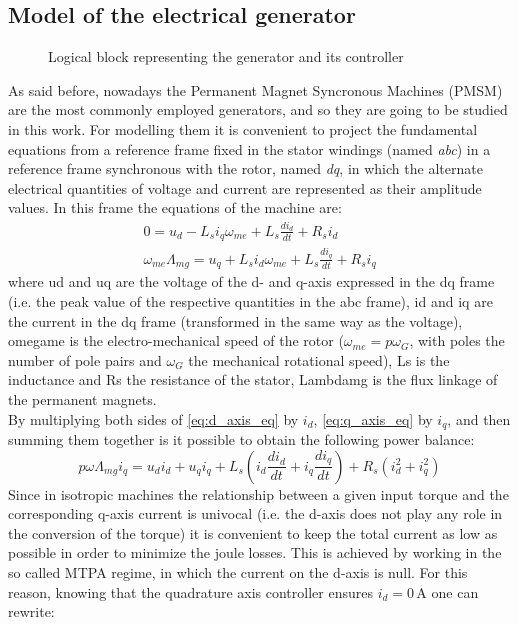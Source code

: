 \subsection[Electrical generator]{Model of the electrical generator}\label{subsec:electrical_generator_description}
\begin{figure}[htb]
  \centering
  
  \caption{Logical block representing the generator and its controller}
  \label{fig:d_generator_block}
\end{figure}

As said before, nowadays the Permanent Magnet Syncronous Machines (PMSM) are the most commonly employed generators, and so they are going to be studied in this work. For modelling them it is convenient to project the fundamental equations from a reference frame fixed in the stator windings (named \textit{abc}) in a reference frame synchronous with the rotor, named \textit{dq}, in which the alternate electrical quantities of voltage and current are represented as their amplitude values. 
In this frame the equations of the machine are:
\begin{gather}
  0=u_d-L_{s}i_q\omega_{me}+L_{s}\frac{di_d}{dt}+R_{s}i_d 
  \label{eq:d_axis_eq}\\
  \omega_{me}\Lambda_{mg}=u_q+L_{s}i_d\omega_{me}+L_{s}\frac{di_q}{dt}+R_{s}i_q
  \label{eq:q_axis_eq}
\end{gather}
where \acrshort{ud} and \acrshort{uq} are the voltage of the d- and q-axis expressed in the dq frame (i.e. the peak value of the respective quantities in the abc frame), \acrshort{id} and \acrshort{iq} are the current in the dq frame (transformed in the same way as the voltage), \acrshort{omegame} is the electro-mechanical speed of the rotor ($\omega_{me}=p\omega_G$, with \acrshort{poles} the number of pole pairs and $\omega_G$ the mechanical rotational speed), \acrshort{Ls} is the inductance and \acrshort{Rs} the resistance of the stator, \acrshort{Lambdamg} is the flux linkage of the permanent magnets.\\
By multiplying both sides of \autoref{eq:d_axis_eq} by $i_d$, \autoref{eq:q_axis_eq} by $i_q$, and then summing them together is it possible to obtain the following power balance:
\begin{equation}
  p\omega\Lambda_{mg}i_q=u_di_d + u_qi_q+ L_{s}\left(i_d\frac{di_d}{dt} + i_q\frac{di_q}{dt}\right) + R_{s}(i_d^2 + i_q^2)
  \label{eq:gen_power_balance}
\end{equation}
Since in isotropic machines the relationship between a given input torque and the corresponding q-axis current is univocal (i.e. the d-axis does not play any role in the conversion of the torque) it is convenient to keep the total current as low as possible in order to minimize the joule losses. This is achieved by working in the so called \acrfull{MTPA} regime, in which the current on the d-axis is null. For this reason, knowing that the quadrature axis controller ensures $i_d=0 \, \si{\ampere}$ one can rewrite:
